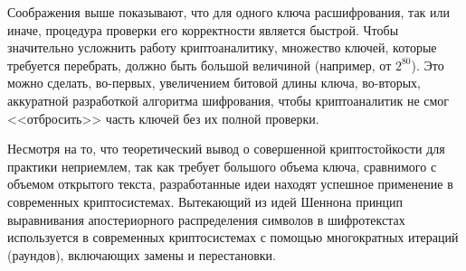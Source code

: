 Соображения выше показывают, что для одного ключа расшифрования, так или иначе, процедура проверки его корректности является быстрой. Чтобы значительно усложнить работу криптоаналитику, множество ключей, которые требуется перебрать, должно быть большой величиной (например, от $2^{80}$). Это можно сделать, во-первых, увеличением битовой длины ключа, во-вторых, аккуратной разработкой алгоритма шифрования, чтобы криптоаналитик не смог <<отбросить>> часть ключей без их полной проверки.

Несмотря на то, что теоретический вывод о совершенной криптостойкости для практики неприемлем, так как требует большого объема ключа, сравнимого с объемом открытого текста, разработанные идеи находят успешное применение в современных криптосистемах. Вытекающий из идей Шеннона принцип выравнивания апостериорного распределения символов в шифротекстах используется в современных криптосистемах с помощью многократных итераций (раундов), включающих замены и перестановки.
